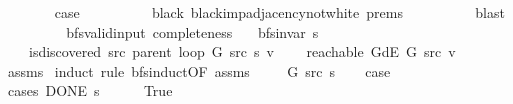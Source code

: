 \begin{isabellebody}
\ \ \ \ \ \ \isamarkupfalse%
\ {\isacharquery}{\kern0pt}case\isanewline
\ \ \ \ \ \ \ \ \isamarkupfalse%
\ black\ black{\isacharunderscore}{\kern0pt}imp{\isacharunderscore}{\kern0pt}adjacency{\isacharunderscore}{\kern0pt}not{\isacharunderscore}{\kern0pt}white\ {\isachardoublequoteopen}{}{\isachardot}{\kern0pt}prems{\isachardoublequoteclose}{\isacharparenleft}{\kern0pt}{}{\isacharparenright}{\kern0pt}\isanewline
\ \ \ \ \ \ \ \ \isamarkupfalse%
\ blast\isanewline
\ \ \ \ \isamarkupfalse%
\isanewline
\ \ \isamarkupfalse%
\isanewline
{}\isamarkupfalse%
%
\endisatagproof
{\isafoldproof}%
%
\isadelimproof
\isanewline
%
\endisadelimproof
\isanewline
{}\isamarkupfalse%
\ {\isacharparenleft}{\kern0pt}\ bfs{\isacharunderscore}{\kern0pt}valid{\isacharunderscore}{\kern0pt}input{\isacharparenright}{\kern0pt}\ completeness{\isacharcolon}{\kern0pt}\isanewline
\ \ \ {\isachardoublequoteopen}bfs{\isacharunderscore}{\kern0pt}invar{\isacharprime}{\kern0pt}{\isacharprime}{\kern0pt}\ s{\isachardoublequoteclose}\isanewline
\ \ \ {\isachardoublequoteopen}{\isasymnot}\ is{\isacharunderscore}{\kern0pt}discovered\ src\ {\isacharparenleft}{\kern0pt}parent\ {\isacharparenleft}{\kern0pt}loop\ G\ src\ s{\isacharparenright}{\kern0pt}{\isacharparenright}{\kern0pt}\ v{\isachardoublequoteclose}\isanewline
\ \ \ {\isachardoublequoteopen}{\isasymnot}\ reachable\ {\isacharparenleft}{\kern0pt}G{\isachardot}{\kern0pt}dE\ G{\isacharparenright}{\kern0pt}\ src\ v{\isachardoublequoteclose}\isanewline
%
\isadelimproof
\ \ %
\endisadelimproof
%
\isatagproof
{}\isamarkupfalse%
\ assms\isanewline
{}\isamarkupfalse%
\ {\isacharparenleft}{\kern0pt}induct\ rule{\isacharcolon}{\kern0pt}\ bfs{\isacharunderscore}{\kern0pt}induct{\isacharbrackleft}{\kern0pt}OF\ assms{\isacharparenleft}{\kern0pt}{}{\isacharparenright}{\kern0pt}{\isacharbrackright}{\kern0pt}{\isacharparenright}{\kern0pt}\isanewline
\ \ \isamarkupfalse%
\ {\isacharparenleft}{\kern0pt}{}\ G\ src\ s{\isacharparenright}{\kern0pt}\isanewline
\ \ \isamarkupfalse%
\ {\isacharquery}{\kern0pt}case\isanewline
\ \ \isamarkupfalse%
\ {\isacharparenleft}{\kern0pt}cases\ {\isachardoublequoteopen}DONE\ s{\isachardoublequoteclose}{\isacharparenright}{\kern0pt}\isanewline
\ \ \ \ \isamarkupfalse%
\ True\isanewline
\ \ \ \ \isamarkupfalse%

\end{isabellebody}

